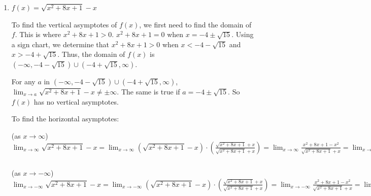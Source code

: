 \documentclass[handout,nooutcomes]{ximera}
\begin{document}
\begin{problem}
\begin{enumerate}
\begin{freeResponse}
		In order for the graph of $f(x)$ to cross $y = \frac{\sqrt{2}}{3}$, we must have that 
		$\frac{\sqrt{2x^2 + 1}}{3x-5} = \frac{\sqrt{2}}{3}
		\qquad \Longrightarrow \qquad 3 \sqrt{2x^2+1} = \sqrt{2}(3x-5)
		\qquad \Longrightarrow \qquad 9 (2x^2 + 1) = 2(9x^2 - 30x + 25)
		\qquad \Longrightarrow \qquad 18x^2 + 9 = 18x^2 - 60x + 50
		\qquad \Longrightarrow \qquad 60x = 41
		\qquad \Longrightarrow \qquad x = \frac{41}{60}$.
		
		We need to check this:  $f \left( \frac{41}{60} \right) = -\frac{\sqrt{2}}{3}$.  So the graph of $f(x)$ never crosses the line $y= \frac{\sqrt{2}}{3}$, but it crosses $y= -\frac{\sqrt{2}}{3}$ at the point $\left( \frac{41}{60}, - \frac{\sqrt{2}}{3} \right)$.  
		\end{freeResponse}
	
	
	
	\item  $f(x) = \sqrt{x^2 + 8x + 1} - x$
	
		\begin{freeResponse}
		To find the vertical asymptotes of $f(x)$, we first need to find the domain of $f$.  This is where $x^2 + 8x + 1 > 0$.  $x^2 + 8x + 1 = 0$ when $x = -4 \pm \sqrt{15}$.   Using a sign chart, we determine that $x^2 + 8x + 1 > 0$ when $x < -4 - \sqrt{15}$ and $x > -4 + \sqrt{15}$.  Thus, the domain of $f(x)$ is $(-\infty, -4-\sqrt{15}) \cup (-4 + \sqrt{15}, \infty)$.  
		
		For any $a$ in $(-\infty, -4-\sqrt{15}) \cup (-4 + \sqrt{15}, \infty)$, $\lim_{x \to a} \sqrt{x^2 + 8x + 1} - x \neq \pm \infty$.  The same is true if $a = -4 \pm \sqrt{15}$.  So $f(x)$ has no vertical asymptotes.
		
		To find the horizontal asymptotes:
		
		(as $x \to \infty$)  $\lim_{x \to \infty} \sqrt{x^2 + 8x + 1} - x
		= \lim_{x \to \infty} \left( \sqrt{x^2 + 8x + 1} - x \right) \cdot \left( \frac{\sqrt{x^2 + 8x + 1} + x}{\sqrt{x^2 + 8x + 1} + x} \right) 
		=  \lim_{x \to \infty} \frac{x^2 + 8x + 1 - x^2}{\sqrt{x^2 + 8x + 1} + x} 
		= \lim_{x \to \infty} \frac{x \left( 8 + \frac{1}{x} \right)}{x \left( \sqrt{1 + \frac{8}{x} + \frac{1}{x^2}} + 1 \right)}
		= \lim_{x \to \infty} \frac{8 + \frac{1}{x}}{\sqrt{1 + \frac{8}{x} + \frac{1}{x^2}} + 1} 
		= \frac{8 + 0}{\sqrt{1 + 0 + 0} + 1}
		= \frac{8}{2} = 4.$
		
		(as $x \to -\infty$)  $\lim_{x \to -\infty} \sqrt{x^2 + 8x + 1} - x
		= \lim_{x \to -\infty} \left( \sqrt{x^2 + 8x + 1} - x \right) \cdot \left( \frac{\sqrt{x^2 + 8x + 1} + x}{\sqrt{x^2 + 8x + 1} + x} \right) 
		=  \lim_{x \to -\infty} \frac{x^2 + 8x + 1 - x^2}{\sqrt{x^2 + 8x + 1} + x} 
		= \lim_{x \to -\infty} \frac{x \left( 8 + \frac{1}{x} \right)}{-x \left( \sqrt{1 + \frac{8}{x} + \frac{1}{x^2}} + 1 \right)}
		= \lim_{x \to -\infty} - \frac{8 + \frac{1}{x}}{\sqrt{1 + \frac{8}{x} + \frac{1}{x^2}} + 1} 
		= -\frac{8 + 0}{\sqrt{1 + 0 + 0} + 1}
		= -\frac{8}{2} = -4.$
		

\end{freeResponse}
\end{enumerate}
\end{problem}
\end{document}
